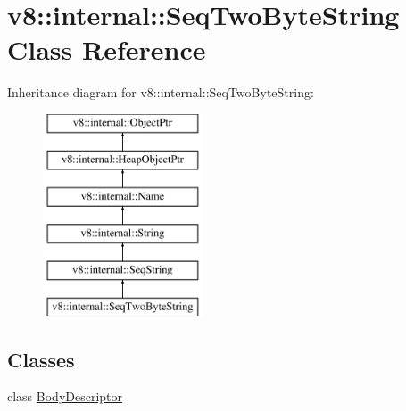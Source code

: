 \hypertarget{classv8_1_1internal_1_1SeqTwoByteString}{}\section{v8\+:\+:internal\+:\+:Seq\+Two\+Byte\+String Class Reference}
\label{classv8_1_1internal_1_1SeqTwoByteString}
Inheritance diagram for v8\+:\+:internal\+:\+:Seq\+Two\+Byte\+String\+:\begin{figure}[H]
\begin{center}
\leavevmode
\includegraphics[height=6.000000cm]{classv8_1_1internal_1_1SeqTwoByteString}
\end{center}
\end{figure}
\subsection*{Classes}
\begin{DoxyCompactItemize}
\item 
class \mbox{\hyperlink{classv8_1_1internal_1_1SeqTwoByteString_1_1BodyDescriptor}{Body\+Descriptor}}
\end{DoxyCompactItemize}
